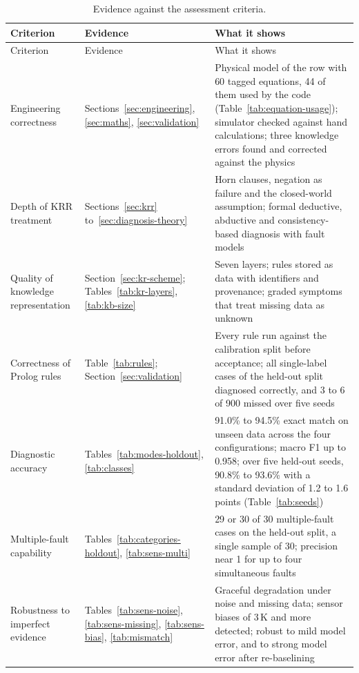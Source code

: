 \begin{small}
\begin{longtable}{L{3.2cm}L{3.6cm}L{7.2cm}}
  \caption{Evidence against the assessment criteria.}\label{tab:criteria}\\
  \toprule
  Criterion & Evidence & What it shows \\
  \midrule
  \endfirsthead
  \toprule
  Criterion & Evidence & What it shows \\
  \midrule
  \endhead
  Engineering correctness & Sections~\ref{sec:engineering}, \ref{sec:maths}, \ref{sec:validation} & Physical model of the row with 60 tagged equations, 44 of them used by the code (Table~\ref{tab:equation-usage}); simulator checked against hand calculations; three knowledge errors found and corrected against the physics \\
  Depth of KRR treatment & Sections~\ref{sec:krr} to~\ref{sec:diagnosis-theory} & Horn clauses, negation as failure and the closed-world assumption; formal deductive, abductive and consistency-based diagnosis with fault models \\
  Quality of knowledge representation & Section~\ref{sec:kr-scheme}; Tables~\ref{tab:kr-layers}, \ref{tab:kb-size} & Seven layers; rules stored as data with identifiers and provenance; graded symptoms that treat missing data as unknown \\
  Correctness of Prolog rules & Table~\ref{tab:rules}; Section~\ref{sec:validation} & Every rule run against the calibration split before acceptance; all single-label cases of the held-out split diagnosed correctly, and 3 to 6 of 900 missed over five seeds \\
  Diagnostic accuracy & Tables~\ref{tab:modes-holdout}, \ref{tab:classes} & 91.0\% to 94.5\% exact match on unseen data across the four configurations; macro F1 up to 0.958; over five held-out seeds, 90.8\% to 93.6\% with a standard deviation of 1.2 to 1.6 points (Table~\ref{tab:seeds}) \\
  Multiple-fault capability & Tables~\ref{tab:categories-holdout}, \ref{tab:sens-multi} & 29 or 30 of 30 multiple-fault cases on the held-out split, a single sample of 30; precision near 1 for up to four simultaneous faults \\
  Robustness to imperfect evidence & Tables~\ref{tab:sens-noise}, \ref{tab:sens-missing}, \ref{tab:sens-bias}, \ref{tab:mismatch} & Graceful degradation under noise and missing data; sensor biases of 3\,K and more detected; robust to mild model error, and to strong model error after re-baselining \\

\end{longtable}
\end{small}
